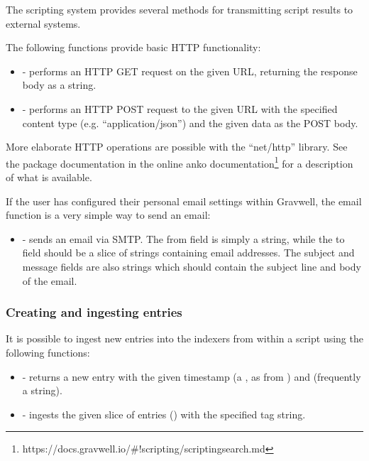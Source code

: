The scripting system provides several methods for transmitting script
results to external systems.

The following functions provide basic HTTP functionality:

\begin{itemize}
\tightlist
\item
   - performs an HTTP GET request on the
  given URL, returning the response body as a string.
\item
   - performs an
  HTTP POST request to the given URL with the specified content type
  (e.g. ``application/json'') and the given data as the POST body.
\end{itemize}

More elaborate HTTP operations are possible with the ``net/http''
library. See the package documentation in
the online anko
documentation\footnote{https://docs.gravwell.io/\#!scripting/scriptingsearch.md} for a description of what is available.

If the user has configured their personal email settings within
Gravwell, the email function is a very simple way to send an email:

\begin{itemize}
\tightlist
\item
   - sends an email via SMTP.
  The from field is simply a string, while the to field should be a slice of
  strings containing email addresses. The subject and message fields are
  also strings which should contain the subject line and body of the
  email.
\end{itemize}

\subsubsection{Creating and ingesting entries}

It is possible to ingest new entries into the indexers from within a
script using the following functions:

\begin{itemize}
\tightlist
\item
   - returns a new entry with the
  given timestamp (a , as from ) and
   (frequently a string).
\item
   - ingests the given slice of
  entries () with the specified tag string.
\end{itemize}

